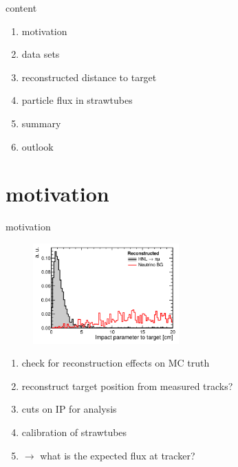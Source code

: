 



\maketitle


\begin{frame}[t]{content}
  \begin{enumerate} \setlength\itemsep{0.5cm}
    \item {\Large motivation}
    \item {\Large data sets}
    \item {\Large reconstructed distance to target}
    \item {\Large particle flux in strawtubes}
    \item {\Large summary}
    \item {\Large outlook}
  \end{enumerate}
\end{frame}

\section{motivation}

\begin{frame}[t]{motivation}
  \begin{multicols}{2}
    \begin{figure}
      \centering
      \includegraphics[width=0.5\textwidth]{IP_cut.png}
    \end{figure}
    \columnbreak
    \vspace*{\fill}
      \begin{enumerate}
        \item check for reconstruction effects on MC truth
        \item reconstruct target position from measured tracks?
        \item cuts on IP for analysis
        \item calibration of strawtubes
        \item $\rightarrow$ what is the expected flux at tracker?
      \end{enumerate}
    \vspace*{\fill}
  \end{multicols}
\end{frame}

